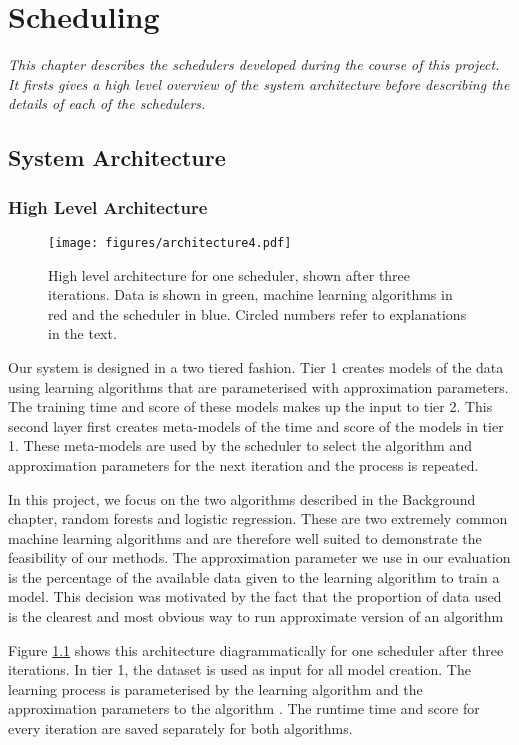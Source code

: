 \documentclass[a4paper,12pt,twoside,openright]{report}
\begin{document}
\chapter{Scheduling} 
\label{ch:scheduling}
\textit{This chapter describes the schedulers developed during the course of this project. It firsts gives a high level overview of the system architecture before describing the details of each of the schedulers.}

\section{System Architecture}

\subsection{High Level Architecture}
\begin{figure}[p]
    \centerline{\texttt{[image: figures/architecture4.pdf]}}
  \caption{High level architecture for one scheduler, shown after three iterations. Data is shown in green, machine learning algorithms in red and the scheduler in blue. Circled numbers refer to explanations in the text.}
    \label{architecture}
\end{figure}


Our system is designed in a two tiered fashion. Tier 1 creates models of the data using learning algorithms that are parameterised with approximation parameters. The training time and score of these models makes up the input to tier 2. This second layer first creates meta-models of the time and score of the models in tier 1. These meta-models are used by the scheduler to select the algorithm and approximation parameters for the next iteration and the process is repeated.

In this project, we focus on the two algorithms described in the Background chapter, random forests and logistic regression. These are two extremely common machine learning algorithms and are therefore well suited to demonstrate the feasibility of our methods. The approximation parameter we use in our evaluation is the percentage of the available data given to the learning algorithm to train a model. This decision was motivated by the fact that the proportion of data used is the clearest and most obvious way to run approximate version of an algorithm 

Figure \ref{architecture} shows this architecture diagrammatically for one scheduler after three iterations. In tier 1, the dataset \raisebox{.5pt}{\textcircled{\raisebox{-.9pt} {1}}} is used as input for all model creation. The learning process is parameterised by the learning algorithm and the approximation parameters to the algorithm \raisebox{.5pt}{\textcircled{\raisebox{-.9pt} {2}}}. The runtime time and score for every iteration are saved \raisebox{.5pt}{\textcircled{\raisebox{-.9pt} {3}}} separately for both algorithms.
\end{document}
